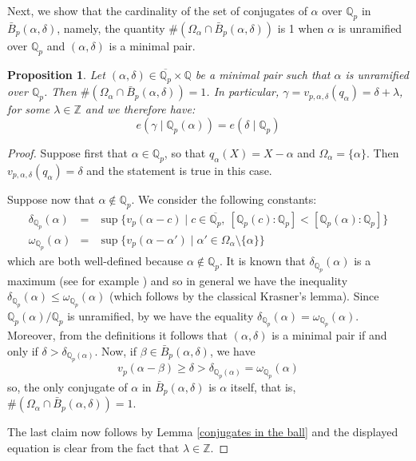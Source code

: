 \documentclass[10pt]{article}
\numberwithin{equation}{section}
\newtheorem{Prop}[equation]{Proposition}
\theoremstyle{definition}
\theoremstyle{definition}
\newcommand{\Q}{\mathbb{Q}}
\newcommand{\Z}{\mathbb{Z}}
\newcommand{\oQp}{\overline{\Q_p}}
\begin{document}
Next, we show that the cardinality of the set of conjugates of $\alpha$ over $\Q_p$ in $\bar B_p(\alpha,\delta)$,  namely, the quantity $\#(\Omega_{\alpha}\cap\bar B_p(\alpha,\delta))$ is 1  when $\alpha$ is unramified over $\Q_p$ and $(\alpha,\delta)$ is a minimal pair.

\begin{Prop}\label{unramified implies k=1}
Let $(\alpha,\delta)\in\oQp\times\Q$ be a minimal pair such that $\alpha$ is unramified over $\Q_p$. Then $\#(\Omega_{\alpha}\cap\bar B_p(\alpha,\delta))=1$. In particular, $\gamma=v_{p,\alpha,\delta}(q_{\alpha})=\delta+\lambda$, for some $\lambda\in\Z$ and we therefore have:
$$e(\gamma\mid\Q_p(\alpha))=e(\delta\mid \Q_p)$$
\end{Prop}

\begin{proof}
Suppose first that $\alpha\in\Q_p$, so that $q_{\alpha}(X)=X-\alpha$ and $\Omega_{\alpha}=\{\alpha\}$. Then $v_{p,\alpha,\delta}(q_{\alpha})=\delta$ and the statement is true in this case.

Suppose now that $\alpha\not\in\Q_p$. We consider the following constants:
\begin{eqnarray*}
\delta_{\Q_p}(\alpha)&=&\sup\{v_p(\alpha-c)\mid c\in\oQp, \ [\Q_p(c):\Q_p]<[\Q_p(\alpha):\Q_p]\}\\
\omega_{\Q_p}(\alpha)&=&\sup\{v_p(\alpha-\alpha')\mid\alpha'\in\Omega_{\alpha}\setminus\{\alpha\}\}
\end{eqnarray*}
which are both well-defined because $\alpha\not\in\Q_p$. It is known that $\delta_{\Q_p}(\alpha)$ is a maximum (see for example \cite[Lemma 1.2]{PerStacked}) and so in general we have the inequality $\delta_{\Q_p}(\alpha)\leq\omega_{\Q_p}(\alpha)$ (which follows by the classical Krasner's lemma). Since $\Q_p(\alpha)/\Q_p$ is unramified, by \cite[Theorem 1.3]{Khanduja} we have the equality $\delta_{\Q_p}(\alpha)=\omega_{\Q_p}(\alpha)$. Moreover, from the definitions it follows that $(\alpha,\delta)$ is a minimal pair if and only if $\delta>\delta_{\Q_p(\alpha)}$.  Now, if $\beta\in\bar B_p(\alpha,\delta)$, we have
$$v_p(\alpha-\beta)\geq\delta>\delta_{\Q_p(\alpha)}=\omega_{\Q_p}(\alpha)$$
so, the only conjugate of $\alpha$ in $\bar B_p(\alpha,\delta)$ is $\alpha$ itself, that is, $\#(\Omega_{\alpha}\cap \bar B_p(\alpha,\delta))=1$.

The last claim now follows by Lemma \ref{conjugates in the ball} and the displayed equation is clear from the fact that $\lambda\in\Z$.
\end{proof}
\end{document}
